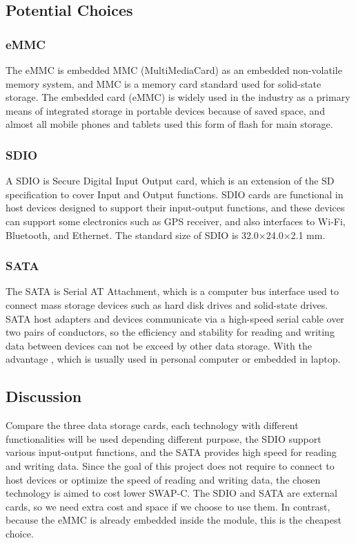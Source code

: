 \documentclass[letterpaper,10pt,serif,draftclsnofoot,onecolumn,compsoc,titlepage]{IEEEtran}
\begin{document}
\subsection{Potential Choices}
\subsubsection{eMMC}
The eMMC is embedded MMC (MultiMediaCard) as an embedded non-volatile memory system, and MMC is a 
memory card standard used for solid-state storage. The embedded card (eMMC) is widely used in the 
industry as a primary means of integrated storage in portable devices because of saved space, and 
almost all mobile phones and tablets used this form of flash for main storage. \\

\subsubsection{SDIO}
A SDIO is Secure Digital Input Output card, which is an extension of the SD specification to cover 
Input and Output functions. SDIO cards are functional in host devices designed to support their 
input-output functions, and these devices can support some electronics such as GPS receiver, and 
also interfaces to Wi-Fi, Bluetooth, and Ethernet. The standard size of SDIO is 32.0×24.0×2.1 mm. \\

\subsubsection{SATA}
The SATA is Serial AT Attachment, which is a computer bus interface used to connect mass storage 
devices such as hard disk drives and solid-state drives. SATA host adapters and devices communicate 
via a high-speed serial cable over two pairs of conductors, so the efficiency and stability for 
reading and writing data between devices can not be exceed by other data storage. With the advantage
, which is usually used in personal computer or embedded in laptop. \\

\subsection{Discussion}
Compare the three data storage cards, each technology with different functionalities will be used 
depending different purpose, the SDIO support various input-output functions, and the SATA provides high 
speed for reading and writing data. Since the goal of this project does not require to connect to host 
devices or optimize the speed of reading and writing data, the chosen technology is aimed to cost lower 
SWAP-C. The SDIO and SATA are external cards, so we need extra cost and space if we choose to use them. 
In contrast, because the eMMC is already embedded inside the module, this is the cheapest choice.\\
\end{document}
